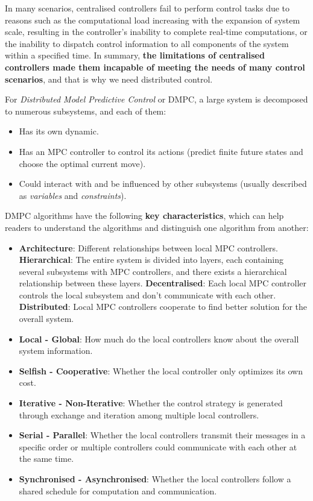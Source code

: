 

In many scenarios, centralised controllers fail to perform control tasks due to reasons such as the computational load increasing with the expansion of system scale, 
resulting in the controller's inability to complete real-time computations, 
or the inability to dispatch control information to all components of the system within a specified time. 
In summary, \textbf{the limitations of centralised controllers made them incapable of meeting the needs of many control scenarios}, and that is why we need distributed control.

For \textit{Distributed Model Predictive Control} or DMPC, a large system is decomposed to numerous subsystems, and each of them:
\begin{itemize}
  \item Has its own dynamic.
  \item Has an MPC controller to control its actions (predict finite future states and choose the optimal current move).
  \item Could interact with and be influenced by other subsystems (usually described as \textit{variables} and \textit{constraints}).
\end{itemize}


DMPC algorithms have the following \textbf{key characteristics}, which can help readers to understand the algorithms and distinguish one algorithm from another:

\begin{itemize}
  \item \textbf{Architecture}: Different relationships between local MPC controllers. \textbf{Hierarchical}: The entire system is divided into layers, each containing several subsystems with MPC controllers, and there exists a hierarchical relationship between these layers. \textbf{Decentralised}: Each local MPC controller controls the local subsystem and don't communicate with each other. \textbf{Distributed}: Local MPC controllers cooperate to find better solution for the overall system.   
  \item \textbf{Local - Global}: How much do the local controllers know about the overall system information.
  \item \textbf{Selfish - Cooperative}: Whether the local controller only optimizes its own cost.
  \item \textbf{Iterative - Non-Iterative}: Whether the control strategy is generated through exchange and iteration among multiple local controllers.
  \item \textbf{Serial - Parallel}: Whether the local controllers transmit their messages in a specific order or multiple controllers could communicate with each other at the same time.
  \item \textbf{Synchronised - Asynchronised}: Whether the local controllers follow a shared schedule for computation and communication. 
\end{itemize}


